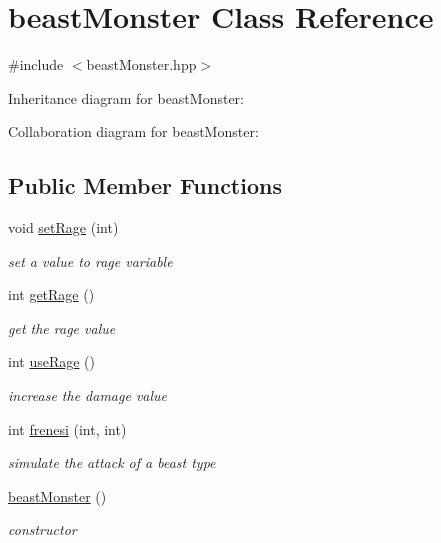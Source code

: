 \hypertarget{classbeastMonster}{}\section{beast\+Monster Class Reference}
\label{classbeastMonster}


{\ttfamily \#include $<$beast\+Monster.\+hpp$>$}



Inheritance diagram for beast\+Monster\+:


Collaboration diagram for beast\+Monster\+:
\subsection*{Public Member Functions}
\begin{DoxyCompactItemize}
\item 
void \hyperlink{classbeastMonster_aa8eb4568cfae1b728b191368d25e56bf}{set\+Rage} (int)
\begin{DoxyCompactList}\small\item\em set a value to rage variable \end{DoxyCompactList}\item 
int \hyperlink{classbeastMonster_a293b4452b9df6c4cc294e9b350f737ce}{get\+Rage} ()
\begin{DoxyCompactList}\small\item\em get the rage value \end{DoxyCompactList}\item 
int \hyperlink{classbeastMonster_a6f982d046a8ac326388e83584fa2972d}{use\+Rage} ()
\begin{DoxyCompactList}\small\item\em increase the damage value \end{DoxyCompactList}\item 
int \hyperlink{classbeastMonster_a179a71696f96b6bd4c7406acb0f67668}{frenesi} (int, int)
\begin{DoxyCompactList}\small\item\em simulate the attack of a beast type \end{DoxyCompactList}\item 
\hyperlink{classbeastMonster_a4fa6bef886d71671e64d1c71e9f18c67}{beast\+Monster} ()
\begin{DoxyCompactList}\small\item\em constructor \end{DoxyCompactList}\end{DoxyCompactItemize}
